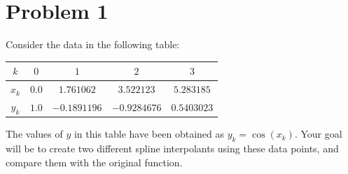 \ifx\undefined\sol
\newpage
\fi

\section{Problem 1}%
\label{sec:problem_1}
Consider the data in the following table:
\begin{table}[!hbtp]
  \centering
  \begin{tabular}{ccccc}
    \toprule
    $k$     & $0$   & $1$          & $2$          & $3$         \\
    \midrule
    $x_{k}$ & $0.0$ & $1.761062$   & $3.522123$   & $5.283185$  \\
    $y_{k}$ & $1.0$ & $-0.1891196$ & $-0.9284676$ & $0.5403023$ \\
    \bottomrule
  \end{tabular}
\end{table}

The values of $y$ in this table have been obtained as $y_{k} = \cos(x_{k})$. Your goal will be to create two different spline interpolants using these data points, and compare them with the original function.

